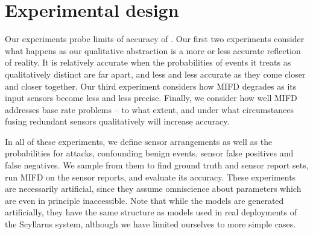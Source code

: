 \section{Experimental design}
\label{sec:experimental-design}

Our experiments probe limits of accuracy of \zplus.
Our first two experiments consider what happens as our qualitative abstraction
is a more or less accurate reflection of reality.  It is relatively accurate when the
probabilities of events it treats as qualitatively distinct are far apart, and
less and less accurate as they come closer and closer together. 
Our third experiment considers how MIFD degrades as its input sensors become
less and less precise.
Finally, we consider how well MIFD addresses base rate problems -- to what
extent, and under what circumstances fusing redundant sensors qualitatively will
increase accuracy.

In all of these experiments, we define sensor arrangements as well as the probabilities for attacks, confounding
benign events, sensor false positives and false negatives. We sample from
them to find ground truth and sensor report sets, run MIFD on the sensor
reports, and evaluate its accuracy.
These experiments are necessarily artificial, since they assume
omniscience about parameters which are even in principle inaccessible.
Note that while the models are generated artificially, they
have the same structure as models used in real deployments of the
Scyllarus system, although we have limited ourselves to more simple cases.


